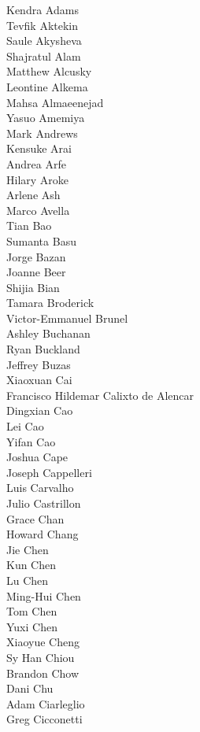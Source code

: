 Kendra Adams\\
Tevfik Aktekin\\
Saule Akysheva\\
Shajratul Alam\\
Matthew Alcusky\\
Leontine Alkema\\
Mahsa Almaeenejad\\
Yasuo Amemiya\\
Mark Andrews\\
Kensuke Arai\\
Andrea Arfe\\
Hilary Aroke\\
Arlene Ash\\
Marco Avella\\
Tian Bao\\
Sumanta Basu\\
Jorge Bazan\\
Joanne Beer\\
Shijia Bian\\
Tamara Broderick\\
Victor-Emmanuel Brunel\\
Ashley Buchanan\\
Ryan Buckland\\
Jeffrey Buzas\\
Xiaoxuan Cai\\
Francisco Hildemar Calixto de Alencar\\
Dingxian Cao\\
Lei Cao\\
Yifan Cao\\
Joshua Cape\\
Joseph Cappelleri\\
Luis Carvalho\\
Julio Castrillon\\
Grace Chan\\
Howard Chang\\
Jie Chen\\
Kun Chen\\
Lu Chen\\
Ming-Hui Chen\\
Tom Chen\\
Yuxi Chen\\
Xiaoyue Cheng\\
Sy Han Chiou\\
Brandon Chow\\
Dani Chu\\
Adam Ciarleglio\\
Greg Cicconetti\\
